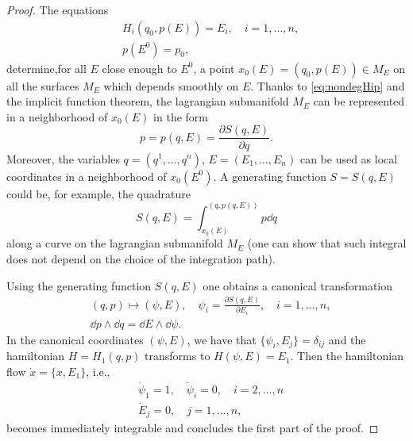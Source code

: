 \documentclass[english,fontsize=11pt,paper=b5]{scrbook}
\numberwithin{equation}{chapter}
\theoremstyle{definition}
\begin{document}
\begin{proof}
        The equations
        \begin{align}
     & H_i(q_0, p(E)) = E_i,\quad i = 1,\ldots,n, \\
     & p(E^0) = p_0,
        \end{align}
        determine,for all $E$ close enough to $E^0$, a point $x_0(E) = (q_0, p(E))\in M_E$ on all the surfaces $M_E$ which depends smoothly on $E$.
        Thanks to \eqref{eq:nondegHip} and the implicit function theorem, the lagrangian submanifold $M_E$ can be represented in a neighborhood of $x_0(E)$ in the form
        \begin{equation}
          p = p(q,E) = \frac{\partial S(q,E)}{\partial q}.
        \end{equation}
        Moreover, the variables $q=(q^1, \ldots, q^n)$, $E= (E_1,\ldots,E_n)$ can be used as local coordinates in a neighborhood of $x_0(E^0)$. A generating function $S=S(q,E)$ could be, for example, the quadrature
        \begin{equation}
          S(q,E) = \int_{x_0(E)}^{(q,p(q,E))} p \dd q
        \end{equation}
        along a curve on the lagrangian submanifold $M_E$ (one can show that such integral does not depend on the choice of the integration path).

        Using the generating function $S(q,E)$ one obtains a canonical transformation
        \begin{align}
     & (q,p)\mapsto (\psi, E), \quad \psi_i = \frac{\partial S(q,E)}{\partial E_i}, \quad i=1,\ldots,n, \\
     & \dd p \wedge \dd q = \dd E \wedge \dd \psi.
        \end{align}
        In the canonical coordinates $(\psi, E)$, we have that $\{\psi_i, E_j\} = \delta_{ij}$ and the hamiltonian $H = H_1(q,p)$ transforms to $H(\psi, E) = E_1$. Then the hamiltonian flow $\dot x = \{x, E_1\}$, i.e.,
        \begin{align}
     & \dot \psi_1 = 1, \quad \dot \psi_i = 0, \quad i=2,\ldots,n \\
     & \dot E_j = 0, \quad j = 1,\ldots, n,
        \end{align}
        becomes immediately integrable and concludes the first part of the proof.
        \medskip


\end{proof}
\end{document}

